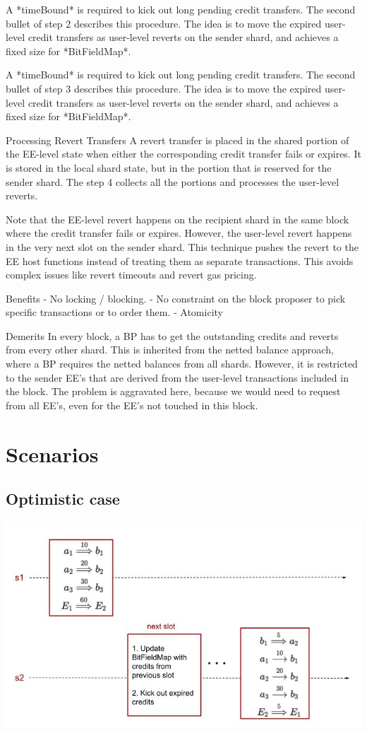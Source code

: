 \documentclass{article}
\begin{document}
A *timeBound* is required to kick out long pending credit transfers. The second bullet of step 2 describes this procedure. The idea is to move the expired user-level credit transfers as user-level reverts on the sender shard, and achieves a fixed size for *BitFieldMap*.

A *timeBound* is required to kick out long pending credit transfers. The second bullet of step 3 describes this procedure. The idea is to move the expired user-level credit transfers as user-level reverts on the sender shard, and achieves a fixed size for *BitFieldMap*.

Processing Revert Transfers
A revert transfer is placed in the shared portion of the EE-level state when either the corresponding credit transfer fails or expires. It is stored in the local shard state, but in the portion that is reserved for the sender shard. The step 4 collects all the portions and processes the user-level reverts. 

Note that the EE-level revert happens on the recipient shard in the same block where the credit transfer fails or expires. However, the user-level revert happens in the very next slot on the sender shard. This technique pushes the revert to the EE host functions instead of treating them as separate transactions. This avoids complex issues like revert timeouts and revert gas pricing.

Benefits
- No locking / blocking.
- No constraint on the block proposer to pick specific transactions or to order them.
- Atomicity

Demerits
In every block, a BP has to get the outstanding credits and reverts from every other shard. This is inherited from the netted balance approach, where a BP requires the netted balances from all shards. However, it is restricted to the sender EE's that are derived from the user-level transactions included in the block. The problem is aggravated here, because we would need to request from all EE's, even for the EE's not touched in this block.

\section{Scenarios}
\subsection{Optimistic case}
\includegraphics[scale=0.5]{OptmisiticCase.jpg}
\end{document}
